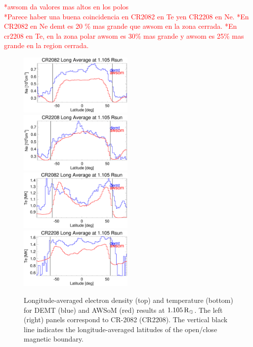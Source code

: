 \documentclass[namedreferences]{solarphysics}
\newcommand{\mrsun}{{\rm R_\odot}}
\begin{document}
\begin{article}
\textcolor{red}{
*awsom da valores mas altos en los polos\\
*Parece haber una buena coincidencia en CR2082 en Te yen CR2208 en Ne.
*En CR2082 en Ne demt es 20 \% mas grande que awsom en la zona cerrada.
*En cr2208 en Te, en la zona polar awsom es 30\% mas grande y awsom es 25\% mas grande en la region cerrada.
}

\begin{figure}[h!]
\begin{center}
\includegraphics[width=0.495\textwidth]{figs/Perfil_Ne_demt_awsom_2082_1105.eps}
\includegraphics[width=0.495\textwidth]{figs/Perfil_Ne_demt_awsom_2208_1105.eps}
\includegraphics[width=0.495\textwidth]{figs/Perfil_Te_demt_awsom_2082_1105.eps}
\includegraphics[width=0.495\textwidth]{figs/Perfil_Te_demt_awsom_2208_1105.eps}
\caption{Longitude-averaged electron density (top) and temperature (bottom) for DEMT (blue) and AWSoM (red) results at $1.105\,\mrsun$. The left (right) panels correspond to CR-2082 (CR2208). The vertical black line indicates the longitude-averaged latitudes of the open/close magnetic boundary.}
\label{perf_lat}
\end{center}
\end{figure}


\end{article}
\end{document}
